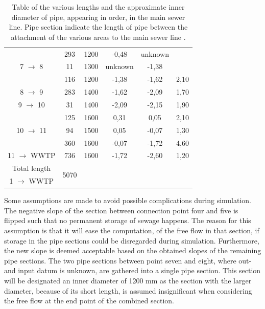\begin{table} [H]
\begin{tabular}{|c|c|c|c|c|c|}
 										 & 293			  & 1200   & -0,48  & unknown&  \\
7 $\rightarrow$ 8						 & 11 			  & 1300   & unknown& -1,38&  \\
			 							 & 116			  & 1200   & -1,38  & -1,62&  2,10\\ \hline
8 $\rightarrow$ 9						 & 283			  & 1400   & -1,62  & -2,09&  1,70\\ \hline
9 $\rightarrow$ 10						 & 31			  & 1400   & -2,09  & -2,15& 1,90 \\ \hline
										 & 125			  & 1600   & 0,31   & 0,05 & 2,10 \\
10 $\rightarrow$ 11	 	 				 & 94			  & 1500   & 0,05   & -0,07& 1,30\\
						 			 	 & 360 			  & 1600   & -0,07  & -1,72& 4,60 \\ \hline
11 $\rightarrow$ WWTP   				 & 736			  & 1600   & -1,72  & -2,60& 1,20\\ \hline
Total length 		    				 & \multirow{2}{*}{5070}  &	  & & & 	 \\ 
1 $\rightarrow$ WWTP    				 &						  &   & & & \\ \hline

\end{tabular}

\caption{Table of the various lengths and the approximate inner diameter of pipe, appearing in order, in the main sewer line. Pipe section indicate the length of pipe between the attachment of the various areas to the main sewer line \cite{GIS_kort}.} 
\label{tab:kloak_diameter}
\end{table}

Some assumptions are made to avoid possible complications during simulation. The negative slope of the section between connection point four and five is flipped such that no permanent storage of sewage happens. The reason for this assumption is that it will ease the computation, of the free flow in that section, if storage in the pipe sections could be disregarded during simulation. Furthermore, the new slope is deemed acceptable based on the obtained slopes of the remaining pipe sections. 
The two pipe sections between point seven and eight, where out- and input datum is unknown, are gathered into a single pipe section. This section will be designated an inner diameter of 1200 mm as the section with the larger diameter, because of its short length, is assumed insignificant when considering the free flow at the end point of the combined section.

